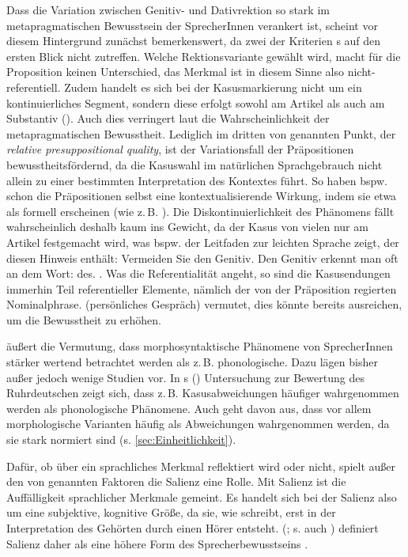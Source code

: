 Dass die Variation zwischen Genitiv- und Dativrektion so stark im metapragmatischen Bewusstsein der SprecherInnen verankert ist, scheint vor diesem Hintergrund zunächst bemerkenswert, da zwei der Kriterien \citeauthor{Silverstein.1976}s auf den ersten Blick nicht zutreffen. 
Welche Rektionsvariante gewählt wird, macht für die Proposition keinen Unterschied, das Merkmal ist in diesem Sinne also nicht-referentiell. 
Zudem handelt es sich bei der Kasusmarkierung nicht um ein kontinuierliches Segment, sondern diese erfolgt sowohl am Artikel als auch am Substantiv (). 
Auch dies verringert laut \citet{Silverstein.1981} die Wahrscheinlichkeit der metapragmatischen Bewusstheit. 
Lediglich im dritten von \citet{Silverstein.1981} genannten Punkt, der \textit{relative presuppositional quality}, ist der Variationsfall der Präpositionen bewusstheitsf{\"o}rdernd, da die Kasuswahl im nat{\"u}rlichen Sprachgebrauch nicht allein zu einer bestimmten Interpretation des Kontextes führt. 
So haben bspw. schon die Pr{\"a}positionen selbst eine kontextualisierende Wirkung, indem sie etwa als formell erscheinen (wie z.\,B. ). 
Die Diskontinuierlichkeit des Phänomens fällt wahrscheinlich deshalb kaum ins Gewicht, da der Kasus von vielen nur am Artikel festgemacht wird, was bspw. der Leitfaden zur leichten Sprache zeigt, der diesen Hinweis enthält: \glqq Vermeiden Sie den Genitiv. 
Den Genitiv erkennt man oft an dem Wort: des.\grqq{} \citep[30]{BMAS.2017}. 
Was die Referentialität angeht, so sind die Kasusendungen immerhin Teil referentieller Elemente, nämlich der von der Präposition regierten Nominalphrase. 
\citeauthor{Silverstein.1981} (persönliches Gespräch) vermutet, dies könnte bereits ausreichen, um die Bewusstheit zu erhöhen.

\citet{Hettler.2013} {\"a}u{\ss}ert die Vermutung, dass morphosyntaktische Ph{\"a}nomene von SprecherInnen st{\"a}rker wertend betrachtet werden als z.\,B. phonologische. 
Dazu lägen bisher außer \citet{Mihm.1985} jedoch wenige Studien vor. 
In \citeauthor{Mihm.1985}s (\citeyear{Mihm.1985}) Untersuchung zur Bewertung des Ruhrdeutschen zeigt sich, dass z.\,B. Kasusabweichungen h{\"a}ufiger wahrgenommen werden als phonologische Ph{\"a}nomene. 
Auch \citet[522]{Harnisch.2005} geht davon aus, dass vor allem morphologische Varianten häufig als Abweichungen wahrgenommen werden, da sie stark normiert sind (s. \autoref{sec:Einheitlichkeit}). 

Dafür, ob über ein sprachliches Merkmal reflektiert wird oder nicht, spielt außer den von \citet{Silverstein.1981} genannten Faktoren die Salienz eine Rolle. 
Mit Salienz ist die Auffälligkeit sprachlicher Merkmale gemeint. 
Es handelt sich bei der Salienz also um eine subjektive, kognitive Größe, da sie, wie \citet[33]{Purschke2014} schreibt, {\glqq}erst in der Interpretation des Gehörten durch einen Hörer entsteht{\grqq}. 
\citeauthor{Lenz2010} (\citeyear{Lenz.2003}; s. auch \citeyear[94]{Lenz2010}) definiert Salienz daher als 
{\glqq}eine h{\"o}here Form des Sprecherbewusstseins{\grqq} \citep[200]{Lenz.2003}.

